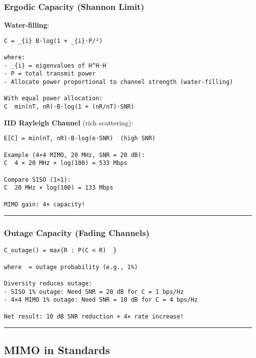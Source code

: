 \subsubsection{Ergodic Capacity (Shannon
Limit)}\label{ergodic-capacity-shannon-limit}

\textbf{Water-filling}:

\begin{verbatim}
C = _{i} B·log(1 + _{i}·P/²)

where:
- _{i} = eigenvalues of H^H·H
- P = total transmit power
- Allocate power proportional to channel strength (water-filling)

With equal power allocation:
C  min(nT, nR)·B·log(1 + (nR/nT)·SNR)
\end{verbatim}

\textbf{IID Rayleigh Channel} (rich scattering):

\begin{verbatim}
E[C] = min(nT, nR)·B·log(e·SNR)  (high SNR)

Example (4×4 MIMO, 20 MHz, SNR = 20 dB):
C  4 × 20 MHz × log(100) = 533 Mbps

Compare SISO (1×1):
C  20 MHz × log(100) = 133 Mbps

MIMO gain: 4× capacity!
\end{verbatim}

\begin{center}\rule{0.5\linewidth}{0.5pt}\end{center}

\subsubsection{Outage Capacity (Fading
Channels)}\label{outage-capacity-fading-channels}

\begin{verbatim}
C_outage() = max{R : P(C < R)  }

where  = outage probability (e.g., 1%)

Diversity reduces outage:
- SISO 1% outage: Need SNR = 20 dB for C = 1 bps/Hz
- 4×4 MIMO 1% outage: Need SNR = 10 dB for C = 4 bps/Hz

Net result: 10 dB SNR reduction + 4× rate increase!
\end{verbatim}

\begin{center}\rule{0.5\linewidth}{0.5pt}\end{center}

\subsection{\texorpdfstring{ MIMO in
Standards}{ MIMO in Standards}}\label{mimo-in-standards}

